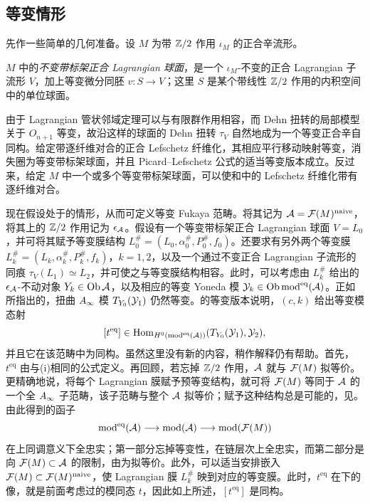 \clearpage
\subsection{等变情形}\label{sec:17k}
先作一些简单的几何准备。设 $M$ 为带 $\mathbb Z/2$ 作用 $\iota_M$ 的正合辛流形。
\begin{definition*}
$M$ 中的\emph{不变带标架正合 Lagrangian 球面}，是一个 $\iota_M$-不变的正合 Lagrangian 子流形 $V$，加上等变微分同胚 $v:S\to V$；这里 $S$ 是某个带线性 $\mathbb Z/2$ 作用的内积空间中的单位球面。
\end{definition*}
由于 Lagrangian 管状邻域定理可以与有限群作用相容，而 Dehn 扭转的局部模型关于 $O_{n+1}$ 等变，故沿这样的球面的 Dehn 扭转 $\tau_V$ 自然地成为一个等变正合辛自同构。给定带逐纤维对合的正合 Lefschetz 纤维化，其相应平行移动映射等变，消失圈为等变带标架球面，并且 Picard–Lefschetz 公式的适当等变版本成立。反过来，给定 $M$ 中一个或多个等变带标架球面，可以使和中的 Lefschetz 纤维化带有逐纤维对合。

现在假设处于的情形，从而可定义等变 Fukaya 范畴。将其记为 $\mathcal A=\mathcal F(M)^{\mathrm{naive}}$，将其上的 $\mathbb Z/2$ 作用记为 $\epsilon_{\mathcal A}$。假设有一个等变带标架正合 Lagrangian
球面 $V=L_0$，并可将其赋予等变膜结构 $L_0^\#=(L_0,\alpha_0^\#,P_0^\#,f_0)$。还要求有另外两个等变膜 $L_k^\#=(L_k,\alpha_k^\#,P_k^\#,f_k)$，$k=1,2$，以及一个通过不变正合 Lagrangian 子流形的同痕 $\tau_V(L_1)\simeq L_2$，并可使之与等变膜结构相容。此时，可以考虑由 $L_k^\#$ 给出的 $\epsilon_{\mathcal A}$-不动对象 $Y_k\in\operatorname{Ob}\mathcal A$，以及相应的等变 Yoneda 模 $\mathcal Y_k\in\operatorname{Ob}\operatorname{mod}^{\mathrm{eq}}(\mathcal A)$。正如所指出的，扭曲 $A_\infty$ 模 $T_{Y_0}(\mathcal Y_1)$ 仍然等变。的等变版本说明，$(c,k)$ 给出等变模态射
\begin{equation}\label{eq:17.24}
[t^{\mathrm{eq}}]\in\operatorname{Hom}_{H^0(\operatorname{mod}^{\mathrm{eq}}(\mathcal A))}(T_{Y_0}(\mathcal Y_1),\mathcal Y_2),
\end{equation}
并且它在该范畴中为同构。虽然这里没有新的内容，稍作解释仍有帮助。首先，$t^{\mathrm{eq}}$ 由与(i)相同的公式定义。再回顾，若忘掉 $\mathbb Z/2$ 作用，$\mathcal A$ 就与 $\mathcal F(M)$ 拟等价。更精确地说，将每个 Lagrangian 膜赋予预等变结构，就可将 $\mathcal F(M)$ 等同于 $\mathcal A$ 的一个全 $A_\infty$ 子范畴，该子范畴与整个 $\mathcal A$ 拟等价；赋予这种结构总是可能的，见。由此得到的函子
\begin{equation}\label{eq:17.25}
\operatorname{mod}^{\mathrm{eq}}(\mathcal A)\longrightarrow\operatorname{mod}(\mathcal A)\longrightarrow\operatorname{mod}(\mathcal F(M))
\end{equation}
在上同调意义下全忠实；第一部分忘掉等变性，在链层次上全忠实，而第二部分是向 $\mathcal F(M)\subset\mathcal A$ 的限制，由为拟等价。此外，可以适当安排嵌入 $\mathcal F(M)\subset\mathcal F(M)^{\mathrm{naive}}$，使 Lagrangian 膜 $L_k^\#$ 映到对应的等变膜。此时，$t^{\mathrm{eq}}$ 在下的像，就是前面考虑过的模同态 $t$，因此如上所述，$[t^{\mathrm{eq}}]$ 是同构。

